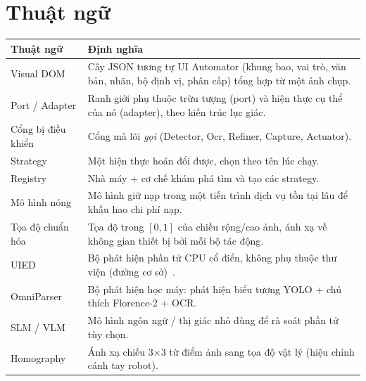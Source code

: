 \documentclass[11pt,a4paper]{report}
\begin{document}
\chapter{Thuật ngữ}
\begin{longtable}{@{}p{3.8cm}p{10.8cm}@{}}
\toprule
\textbf{Thuật ngữ} & \textbf{Định nghĩa} \\
\midrule
\endhead
Visual DOM & Cây JSON tương tự UI Automator (khung bao, vai trò, văn bản, nhãn, bộ định vị, phân cấp) tổng hợp từ một ảnh chụp. \\
Port / Adapter & Ranh giới phụ thuộc trừu tượng (port) và hiện thực cụ thể của nó (adapter), theo kiến trúc lục giác. \\
Cổng bị điều khiển & Cổng mà lõi \emph{gọi} (Detector, Ocr, Refiner, Capture, Actuator). \\
Strategy & Một hiện thực hoán đổi được, chọn theo tên lúc chạy. \\
Registry & Nhà máy + cơ chế khám phá tìm và tạo các strategy. \\
Mô hình nóng & Mô hình giữ nạp trong một tiến trình dịch vụ tồn tại lâu để khấu hao chi phí nạp. \\
Tọa độ chuẩn hóa & Tọa độ trong $[0,1]$ của chiều rộng/cao ảnh, ánh xạ về không gian thiết bị bởi mỗi bộ tác động. \\
UIED & Bộ phát hiện phần tử CPU cổ điển, không phụ thuộc thư viện (đường cơ sở)~\cite{xie2020uied}. \\
OmniParser & Bộ phát hiện học máy: phát hiện biểu tượng YOLO + chú thích Florence-2 + OCR. \\
SLM / VLM & Mô hình ngôn ngữ / thị giác nhỏ dùng để rà soát phần tử tùy chọn. \\
Homography & Ánh xạ chiếu 3$\times$3 từ điểm ảnh sang tọa độ vật lý (hiệu chỉnh cánh tay robot). \\
\bottomrule
\end{longtable}



\end{document}
